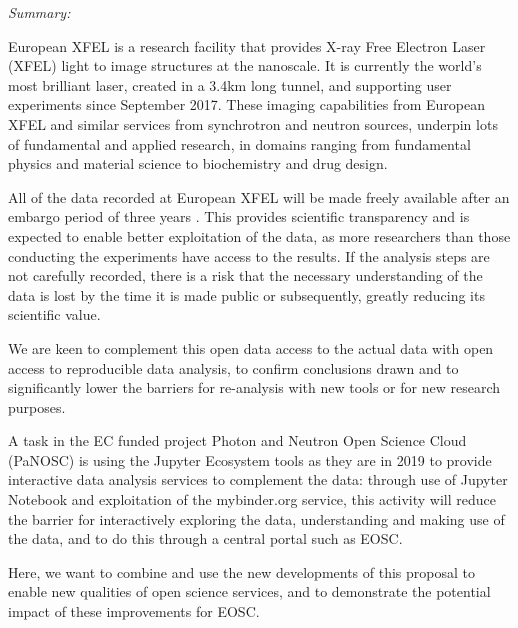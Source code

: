 \begin{task}[
  title=Reproducible X-ray crystallography workflows at European XFEL,
  id=reproducibility-xfel,
  lead=XFEL,
  PM=36,
  wphases={6-48},
  partners={XFEL}
  ]

\emph{Summary:}

  European XFEL is a research facility that provides X-ray Free
  Electron Laser (XFEL) light to image structures at the nanoscale. It
  is currently the world's most brilliant laser, created in a 3.4km
  long tunnel, and supporting user experiments since September
  2017. These imaging capabilities from European XFEL and similar
  services from synchrotron and neutron sources, underpin lots of
  fundamental and applied research, in domains ranging from fundamental
  physics and material science to biochemistry and drug design.

  All of the data recorded at European XFEL will be made freely
  available after an embargo period of three years
  \cite{EuXFEL-datapolicy-2017}. This provides scientific transparency
  and is expected to enable better exploitation of the data, as more
  researchers than those conducting the experiments have access to the
  results. If the analysis steps are not carefully recorded, there is a risk
  that the necessary understanding of the data is lost by the time it
  is made public or subsequently, greatly reducing its scientific
  value.

  We are keen to complement this open data access to the actual data
  with open access to reproducible data analysis, to confirm
  conclusions drawn and to significantly lower the barriers for
  re-analysis with new tools or for new research purposes.

  A task in the EC funded project Photon and Neutron Open Science
  Cloud (PaNOSC) is using the Jupyter Ecosystem tools as they are in
  2019 to provide interactive data analysis services to complement the
  data: through use of Jupyter Notebook and exploitation of the
  mybinder.org service, this activity will reduce the barrier for
  interactively exploring the data, understanding and making use of
  the data, and to do this through a central portal such as EOSC.

  Here, we want to combine and use the new developments of this
  proposal to enable new qualities of open science services, and to
  demonstrate the potential impact of these improvements for EOSC.


\end{task}
